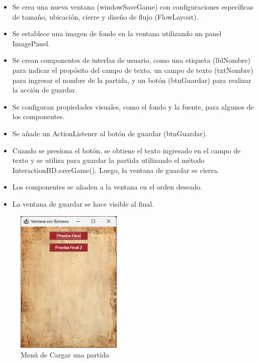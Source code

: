 \documentclass{article}
\begin{document}
    \begin{itemize}	
            \item Se crea una nueva ventana (windowSaveGame) con configuraciones específicas de tamaño, ubicación, cierre y diseño de flujo (FlowLayout).
            \item Se establece una imagen de fondo en la ventana utilizando un panel ImagePanel.
            \item Se crean componentes de interfaz de usuario, como una etiqueta (lblNombre) para indicar el propósito del campo de texto, un campo de texto (txtNombre) para ingresar el nombre de la partida, y un botón (btnGuardar) para realizar la acción de guardar.
            \item  Se configuran propiedades visuales, como el fondo y la fuente, para algunos de los componentes.
            \item Se añade un ActionListener al botón de guardar (btnGuardar).
            \item Cuando se presiona el botón, se obtiene el texto ingresado en el campo de texto y se utiliza para guardar la partida utilizando el método InteractionBD.saveGame(). Luego, la ventana de guardar se cierra.
            \item Los componentes se añaden a la ventana en el orden deseado.
            \item La ventana de guardar se hace visible al final.
	\end{itemize}

\newpage
    \begin{figure}[H]
        \centering
		\includegraphics[width=0.45\textwidth,keepaspectratio]{img/Menu_Cargar_Partida.png}
        \caption{Menú de Cargar una partida}
    \end{figure}
\end{document}
